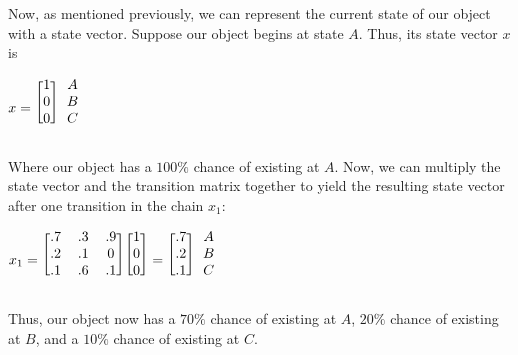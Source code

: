 \documentclass{article}
\begin{document}
\noindent Now, as mentioned previously, we can represent the current state of our object with a state vector. Suppose our object begins at state $A$. Thus, its state vector $x$ is

\begin{center}
    $x = \begin{blockarray}{cc}
        \begin{block}{[c]c} 
            1 & A\\
            0 & B\\
            0 & C\\ 
        \end{block}
    \end{blockarray}$
\end{center}

\noindent Where our object has a $100\%$ chance of existing at $A$. Now, we can multiply the state vector and the transition matrix together to yield the resulting state vector after one transition in the chain $x_1$:

\begin{center}
    $x_1 = 
    \begin{blockarray}{ccc}
        \begin{block}{[ccc]} 
            .7&.3&.9\\
            .2&.1& 0\\
            .1&.6&.1\\ 
        \end{block}
    \end{blockarray}
    \begin{blockarray}{c}
        \begin{block}{[c]} 
            1\\
            0\\
            0\\ 
        \end{block}
    \end{blockarray}
    =
    \begin{blockarray}{cc}
        \begin{block}{[c]c} 
            .7 & A\\
            .2 & B\\
            .1 & C\\ 
        \end{block}
    \end{blockarray}
    $
\end{center}

\noindent Thus, our object now has a $70\%$ chance of existing at $A$, $20\%$ chance of existing at $B$, and a $10\%$ chance of existing at $C$. 
\end{document}
